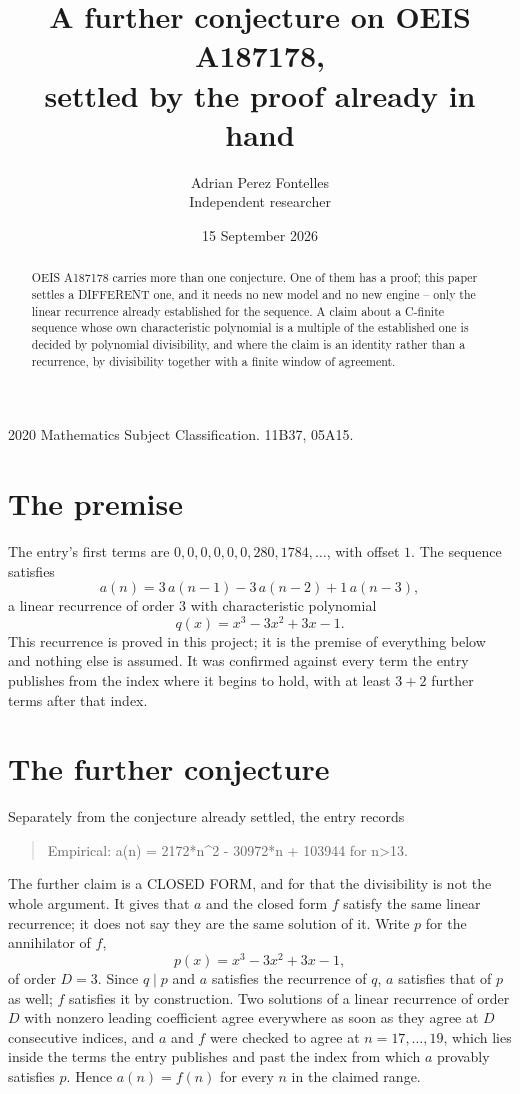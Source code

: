 \documentclass[11pt,a4paper]{article}
\title{A further conjecture on OEIS A187178,\\ \large settled by the proof already in hand}
\author{Adrian Perez Fontelles\\ \small Independent researcher}
\date{15 September 2026}
\theoremstyle{plain}
\theoremstyle{definition}
\begin{document}
\maketitle

\begin{abstract}
OEIS A187178 carries more than one conjecture. One of them has a proof; this paper settles a
DIFFERENT one, and it needs no new model and no new engine -- only the linear recurrence already
established for the sequence. A claim about a C-finite sequence whose own characteristic
polynomial is a multiple of the established one is decided by polynomial divisibility, and where
the claim is an identity rather than a recurrence, by divisibility together with a finite window
of agreement.
\end{abstract}

\noindent\small 2020 Mathematics Subject Classification. 11B37, 05A15.\normalsize

\section{The premise}

The entry's first terms are $0, 0, 0, 0, 0, 0, 280, 1784,\dots$, with offset $1$. The sequence satisfies
\[
  a(n)=3\,a(n-1) - 3\,a(n-2) + 1\,a(n-3) ,
\]
a linear recurrence of order $3$ with characteristic polynomial
\[
  q(x)=x^{3} - 3 x^{2} + 3 x - 1 .
\]
This recurrence is proved in this project; it is the premise of everything below and nothing else is assumed.
It was confirmed against every term the entry publishes from the index where it begins to hold,
with at least $3+2$ further terms after that index.

\section{The further conjecture}

Separately from the conjecture already settled, the entry records

\begin{quote}\raggedright Empirical: a(n) = 2172*n\^{}2 - 30972*n + 103944 for n>13.\end{quote}

The further claim is a CLOSED FORM, and for that the divisibility is not the whole argument. It
gives that $a$ and the closed form $f$ satisfy the same linear recurrence; it does not say they
are the same solution of it. Write $p$ for the annihilator of $f$,
\[
  p(x)=x^{3} - 3 x^{2} + 3 x - 1 ,
\]
of order $D=3$. Since $q\mid p$ and $a$ satisfies the recurrence of $q$, $a$ satisfies that of
$p$ as well; $f$ satisfies it by construction. Two solutions of a linear recurrence of order $D$
with nonzero leading coefficient agree everywhere as soon as they agree at $D$ consecutive
indices, and $a$ and $f$ were checked to agree at $n=17,\dots,19$,
which lies inside the terms the entry publishes and past the index from which $a$ provably
satisfies $p$. Hence $a(n)=f(n)$ for every $n$ in the claimed range.
\end{document}
